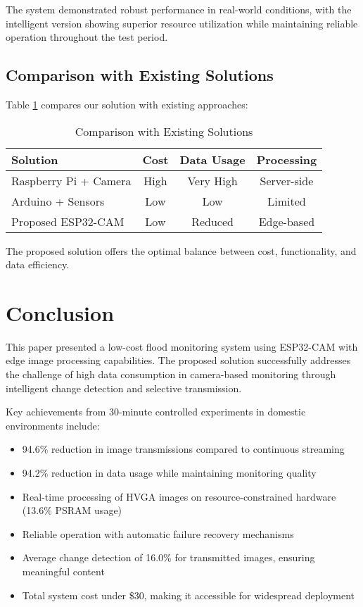 \documentclass[conference]{IEEEtran}
\begin{document}
The system demonstrated robust performance in real-world conditions, with the intelligent version showing superior resource utilization while maintaining reliable operation throughout the test period.

\subsection{Comparison with Existing Solutions}

Table \ref{tab:comparison} compares our solution with existing approaches:

\begin{table}[htbp]
\caption{Comparison with Existing Solutions}
\begin{center}
\begin{tabular}{|l|c|c|c|}
\hline
\textbf{Solution} & \textbf{Cost} & \textbf{Data Usage} & \textbf{Processing} \\
\hline
Raspberry Pi + Camera & High & Very High & Server-side \\
\hline
Arduino + Sensors & Low & Low & Limited \\
\hline
Proposed ESP32-CAM & Low & Reduced & Edge-based \\
\hline
\end{tabular}
\label{tab:comparison}
\end{center}
\end{table}

The proposed solution offers the optimal balance between cost, functionality, and data efficiency.

\section{Conclusion}

This paper presented a low-cost flood monitoring system using ESP32-CAM with edge image processing capabilities. The proposed solution successfully addresses the challenge of high data consumption in camera-based monitoring through intelligent change detection and selective transmission.

Key achievements from 30-minute controlled experiments in domestic environments include:
\begin{itemize}
\item 94.6\% reduction in image transmissions compared to continuous streaming
\item 94.2\% reduction in data usage while maintaining monitoring quality
\item Real-time processing of HVGA images on resource-constrained hardware (13.6\% PSRAM usage)
\item Reliable operation with automatic failure recovery mechanisms
\item Average change detection of 16.0\% for transmitted images, ensuring meaningful content
\item Total system cost under \$30, making it accessible for widespread deployment
\end{itemize}
\end{document}
